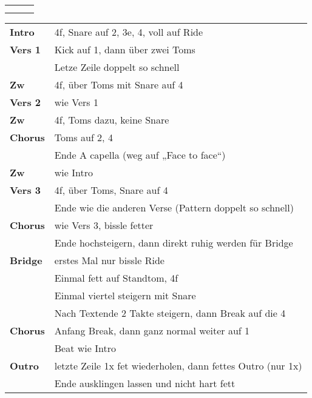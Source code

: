 

\begin{tabular}{p{0.6cm}p{12cm}p{1.4cm}}
	\rowcolor{cyan} \myRow{\thesongnumber} & \myRow{Every Step} & \myRow{104} \\
	                                       &                    &             \\
\end{tabular}

\begin{tabular}{p{1.6cm}l}
	\textbf{Intro}  & 4f, Snare auf 2, 3e, 4, voll auf Ride                       \\
	\textbf{Vers 1} & Kick auf 1, dann über zwei Toms                             \\
	                & Letze Zeile doppelt so schnell                              \\
	\textbf{Zw}     & 4f, über Toms mit Snare auf 4                               \\
	\textbf{Vers 2} & wie Vers 1                                                  \\
	\textbf{Zw}     & 4f, Toms dazu, keine Snare                                  \\
	\textbf{Chorus} & Toms auf 2, 4                                               \\
	                & Ende A capella (weg auf „Face to face“)                     \\
	\textbf{Zw}     & wie Intro                                                   \\
	\textbf{Vers 3} & 4f, über Toms, Snare auf 4                                  \\
	                & Ende wie die anderen Verse (Pattern doppelt so schnell)     \\
	\textbf{Chorus} & wie Vers 3, bissle fetter                                   \\
	                & Ende hochsteigern, dann direkt ruhig werden für Bridge      \\
	\textbf{Bridge} & erstes Mal nur bissle Ride                                  \\
	                & Einmal fett auf Standtom, 4f                                \\
	                & Einmal viertel steigern mit Snare                           \\
	                & Nach Textende 2 Takte steigern, dann Break auf die 4        \\
	\textbf{Chorus} & Anfang Break, dann ganz normal weiter auf 1                 \\
	                & Beat wie Intro                                              \\
	\textbf{Outro}  & letzte Zeile 1x fet wiederholen, dann fettes Outro (nur 1x) \\
	                & Ende ausklingen lassen und nicht hart fett                  \\
\end{tabular}
